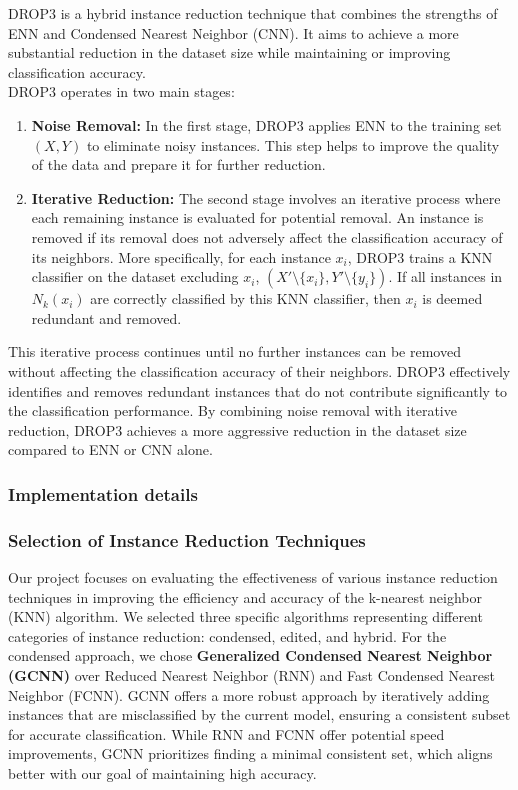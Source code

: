 DROP3 \cite{wilson2000reduction} is a hybrid instance reduction technique that combines the strengths of ENN and 
Condensed Nearest Neighbor (CNN). It aims to achieve a more substantial reduction in the dataset size while 
maintaining or improving classification accuracy.\\

DROP3 operates in two main stages:

\begin{enumerate}
    \item \textbf{Noise Removal:} In the first stage, DROP3 applies ENN to the training set $(X, Y)$ to eliminate noisy instances. This step helps to improve the quality of the data and prepare it for further reduction. 
    \item \textbf{Iterative Reduction:} The second stage involves an iterative process where each remaining instance is evaluated for potential removal. An instance is removed if its removal does not adversely affect the classification accuracy of its neighbors.  More specifically, for each instance $x_i$, DROP3 trains a KNN classifier on the dataset excluding $x_i$, $(X' \setminus \{x_i\}, Y' \setminus \{y_i\})$. If all instances in $N_k(x_i)$ are correctly classified by this KNN classifier, then $x_i$ is deemed redundant and removed.
\end{enumerate}

This iterative process continues until no further instances can be removed without affecting the classification accuracy of their neighbors. DROP3 effectively identifies and removes redundant instances that do not contribute significantly to the classification performance. By combining noise removal with iterative reduction, DROP3 achieves a more aggressive reduction in the dataset size compared to ENN or CNN alone.


\subsubsection{Implementation details}


\subsubsection*{Selection of Instance Reduction Techniques}
Our project focuses on evaluating the effectiveness of various instance reduction techniques in improving
the efficiency and accuracy of the k-nearest neighbor (KNN) algorithm.  We selected three specific algorithms
representing different categories of instance reduction: condensed, edited, and hybrid. For the condensed approach,
we chose \textbf{Generalized Condensed Nearest Neighbor (GCNN)} \cite{hart1968condensed} over 
Reduced Nearest Neighbor (RNN) and Fast Condensed Nearest Neighbor (FCNN). 
GCNN offers a more robust approach by iteratively adding instances that are misclassified by the current model,
ensuring a consistent subset for accurate classification. While RNN and FCNN offer potential speed improvements,
GCNN prioritizes finding a minimal consistent set, which aligns better with our goal of maintaining high accuracy.

